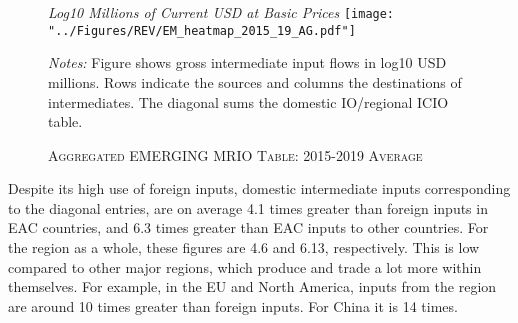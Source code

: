 \documentclass[a4paper]{article}
\begin{document}
\begin{figure}[h!] \vspace{-1mm}
\centering
\caption{\label{fig:wld}\textsc{Aggregated EMERGING MRIO Table: 2015-2019 Average}}
\small{\textit{Log10 Millions of Current USD at Basic Prices}}
\texttt{[image: "../Figures/REV/EM\_heatmap\_2015\_19\_AG.pdf"]} \\ %
\raggedright
\scriptsize
\emph{Notes:} Figure shows gross intermediate input flows in log10 USD millions. Rows indicate the sources and columns the destinations of intermediates. The diagonal sums the domestic IO/regional ICIO table. 
\end{figure}
\FloatBarrier

Despite its high use of foreign inputs, domestic intermediate inputs corresponding to the diagonal entries, are on average 4.1 times greater than foreign inputs in EAC countries, and 6.3 times greater than EAC inputs to other countries. For the region as a whole, these figures are 4.6 and 6.13, respectively. This is low compared to other major regions, which produce and trade a lot more within themselves. For example, in the EU and North America, inputs from the region are around 10 times greater than foreign inputs. For China it is 14 times. \newline  %
\end{document}

